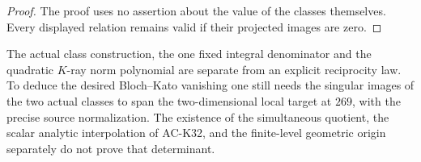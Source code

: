 \begin{proof}
The proof uses no assertion about the value of the
classes themselves.  Every displayed relation remains
valid if their projected images are zero.
\end{proof}

\begin{remark}
The actual class construction, the one fixed integral
denominator and the quadratic \(K\)-ray norm polynomial
are separate from an explicit reciprocity law.
To deduce the desired Bloch--Kato vanishing one still
needs the singular images of the two actual classes
to span the two-dimensional local target at \(269\),
with the precise source normalization.
The existence of the simultaneous quotient, the scalar
analytic interpolation of AC-K32, and the finite-level
geometric origin separately do not prove that determinant.
\end{remark}
